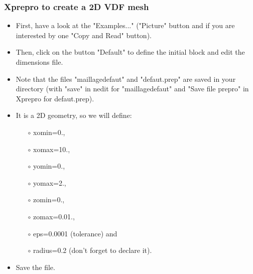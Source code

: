\documentclass[10pt, hyperref={unicode=true,pdfusetitle, bookmarks=true,bookmarksnumbered=false,bookmarksopen=false, breaklinks=false,pdfborder={0 0 1},backref=true,colorlinks=true,linkcolor=darkblue,pageanchor}]{beamer}
\begin{document}
\begin{frame}
\frametitle{Xprepro to create a 2D VDF mesh}
\begin{block}{}

\begin{itemize}
\item First, have a look at the "Examples..." ("Picture" button and if you are interested by one "Copy and Read" button).

\item Then, click on the button "Default" to define the initial block and edit the dimensions file. 
\item Note that the files "maillagedefaut" and "defaut.prep" are saved in your directory (with "save" in nedit for "maillagedefaut" and "Save file prepro" in Xprepro for defaut.prep).

\item It is a 2D geometry, so we will define:
    \begin{itemize}
    \item [$\circ$] xomin=0.,
    \item [$\circ$] xomax=10.,
    \item [$\circ$] yomin=0.,
    \item [$\circ$] yomax=2.,
    \item [$\circ$] zomin=0.,
    \item [$\circ$] zomax=0.01.,
    \item [$\circ$] eps=0.0001 (tolerance) and
    \item [$\circ$] radius=0.2 (don't forget to declare it).
    \end{itemize}
\item Save the file.
\end{itemize}

\end{block}
\end{frame}
\end{document}
